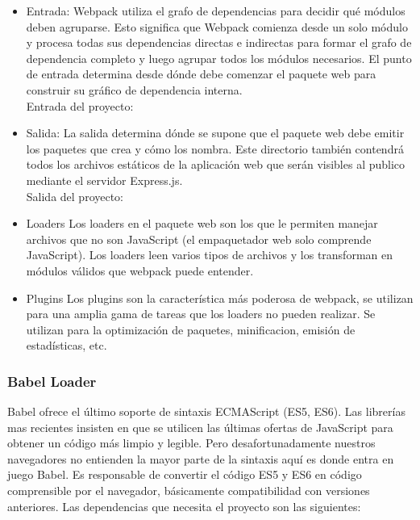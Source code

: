 \begin{itemize}
  \item Entrada:
  Webpack utiliza el grafo de dependencias para decidir qué módulos deben agruparse. Esto significa que Webpack comienza desde un solo módulo y procesa todas sus dependencias directas e indirectas para formar el grafo de dependencia completo y luego agrupar todos los módulos necesarios.
  El punto de entrada determina desde dónde debe comenzar el paquete web para construir su gráfico de dependencia interna.\\
  Entrada del proyecto: 
  \item Salida:
  La salida determina dónde se supone que el paquete web debe emitir los paquetes que crea y cómo los nombra. Este directorio también contendrá todos los archivos estáticos de la aplicación web que serán visibles al publico mediante el servidor Express.js.\\
  Salida del proyecto: 
  \item Loaders
  Los loaders en el paquete web son los que le permiten manejar archivos que no son JavaScript (el empaquetador web solo comprende JavaScript). Los loaders leen varios tipos de archivos y los transforman en módulos válidos que webpack puede entender.
  \item Plugins
  Los \glspl{plugin} son la característica más poderosa de webpack, se utilizan para una amplia gama de tareas que los loaders no pueden realizar. Se utilizan  para la optimización de paquetes, \gls{minificacion}, emisión de estadísticas, etc.
\end{itemize}
\vspace{0.8cm}

\subsubsection{Babel Loader}
Babel ofrece el último soporte de sintaxis ECMAScript (ES5, ES6). Las librerías mas recientes insisten en que se utilicen las últimas ofertas de JavaScript para obtener un código más limpio y legible. Pero desafortunadamente nuestros navegadores no entienden la mayor parte de la sintaxis aquí es donde entra en juego Babel. Es responsable de convertir el código ES5 y ES6 en código comprensible por el navegador, básicamente compatibilidad con versiones anteriores. Las dependencias que necesita el proyecto son las siguientes:
\vspace{0.8cm}

